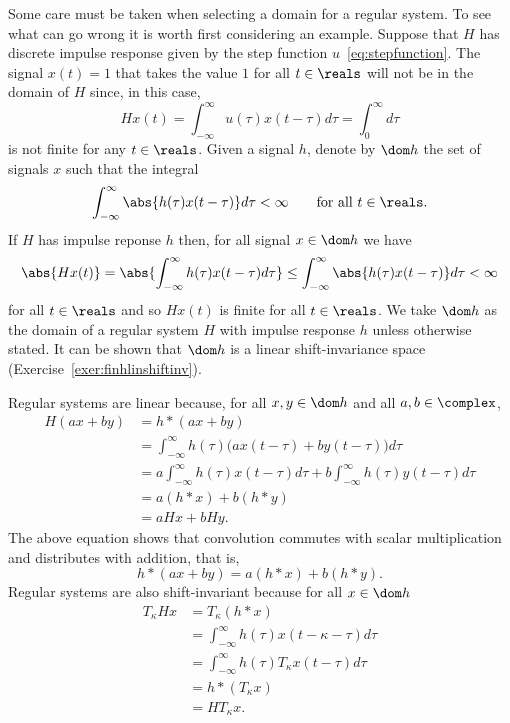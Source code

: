 Some care must be taken when selecting a domain for a regular system.  To see what can go wrong it is worth first considering an example.  Suppose that $H$ has discrete impulse response given by the step function $u$~\eqref{eq:stepfunction}.  The signal $x(t) = 1$ that takes the value $1$ for all $t \in \reals$ will not be in the domain of $H$ since, in this case,
\[
Hx(t) =  \int_{-\infty}^{\infty} u(\tau) x(t - \tau) d\tau = \int_{0}^{\infty} d\tau
\]
is not finite for any $t \in \reals$.  Given a signal $h$, denote by $\dom h$ the set of signals $x$ such that the integral
\[
\int_{-\infty}^{\infty} \abs{h(\tau) x(t - \tau)} d\tau < \infty \qquad \text{for all $t \in \reals$}.
\]
If $H$ has impulse reponse $h$ then, for all signal $x \in \dom h$ we have
\[
\abs{Hx(t)} = \abs{\int_{-\infty}^{\infty} h(\tau) x(t - \tau) d\tau} \leq \int_{-\infty}^{\infty} \abs{h(\tau) x(t - \tau)} d\tau < \infty 
\]
for all $t \in \reals$ and so $Hx(t)$ is finite for all $t \in \reals$.  We take $\dom h$ as the domain of a regular system $H$ with impulse response $h$ unless otherwise stated.  It can be shown that $\dom h$ is a linear shift-invariance space (Exercise~\ref{exer:finhlinshiftinv}).

Regular systems are linear because, for all $x, y \in \dom h$ and all $a, b \in \complex$,
\begin{equation}\begin{split}\label{eq:regsystemislinear}
H(ax + by) &= h * (ax + by) \\
&= \int_{-\infty}^{\infty} h(\tau) \big(ax(t - \tau) + by(t - \tau)\big) d\tau \\
&= a\int_{-\infty}^{\infty} h(\tau) x(t - \tau) d\tau + b\int_{-\infty}^{\infty} h(\tau)y(t - \tau) d\tau \\
&= a (h * x) + b(h*y) \\
&= a Hx + bHy.
\end{split}\end{equation}
The above equation shows that convolution commutes with scalar multiplication and distributes with addition, that is,
\[
h * (ax + by) =  a (h * x) + b(h*y).
\]
Regular systems are also shift-invariant because for all $x \in \dom h$
\begin{align*}
T_\kappa H x &= T_\kappa(h * x ) \\
&= \int_{-\infty}^{\infty} h(\tau) x(t- \kappa - \tau) d\tau \\
&= \int_{-\infty}^{\infty} h(\tau) T_\kappa x(t - \tau) d\tau \\ 
&= h * (T_\kappa x) \\
&= H T_\kappa x. 
\end{align*}

